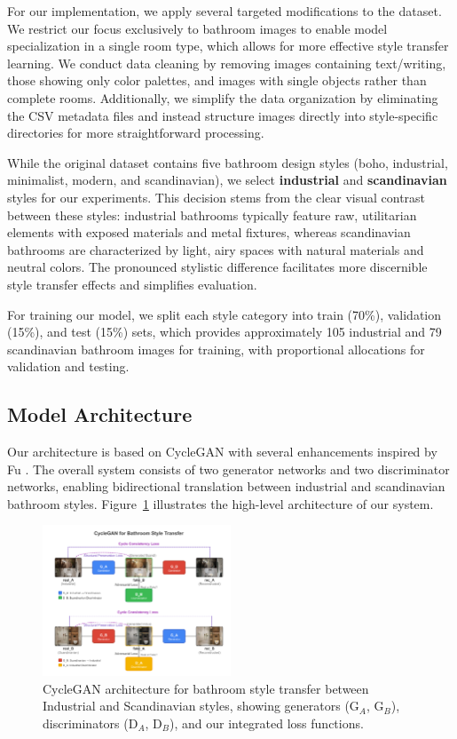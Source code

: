\documentclass[twocolumn,superscriptaddress,aps]{revtex4-1}
\begin{document}
For our implementation, we apply several targeted modifications to the dataset. We restrict our focus exclusively to bathroom images to enable model specialization in a single room type, which allows for more effective style transfer learning. We conduct data cleaning by removing images containing text/writing, those showing only color palettes, and images with single objects rather than complete rooms. Additionally, we simplify the data organization by eliminating the CSV metadata files and instead structure images directly into style-specific directories for more straightforward processing.

While the original dataset contains five bathroom design styles (boho, industrial, minimalist, modern, and scandinavian), we select \textbf{industrial} and \textbf{scandinavian} styles for our experiments. This decision stems from the clear visual contrast between these styles: industrial bathrooms typically feature raw, utilitarian elements with exposed materials and metal fixtures, whereas scandinavian bathrooms are characterized by light, airy spaces with natural materials and neutral colors. The pronounced stylistic difference facilitates more discernible style transfer effects and simplifies evaluation.

For training our model, we split each style category into train (70\%), validation (15\%), and test (15\%) sets, which provides approximately 105 industrial and 79 scandinavian bathroom images for training, with proportional allocations for validation and testing.

\subsection{Model Architecture}

Our architecture is based on CycleGAN \cite{zhu2017unpaired} with several enhancements inspired by Fu \cite{fu2022digital}. The overall system consists of two generator networks and two discriminator networks, enabling bidirectional translation between industrial and scandinavian bathroom styles. Figure~\ref{fig:architecture} illustrates the high-level architecture of our system.

\begin{figure}[htbp]
    \centering
    \includegraphics[width=0.5\textwidth]{assets/cyclegan_architecture.png}
    \caption{CycleGAN architecture for bathroom style transfer between Industrial and Scandinavian styles, showing generators (G$_A$, G$_B$), discriminators (D$_A$, D$_B$), and our integrated loss functions.}
    \label{fig:architecture}
\end{figure}
\end{document}
